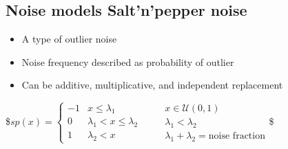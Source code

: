 \documentclass[letterpaper,10pt,english]{sphinxmanual}
\begin{document}
\begin{sphinxVerbatim}[commandchars=\\\{\}]
   
\end{sphinxVerbatim}

\noindent{}


\subsection{Noise models \sphinxhyphen{} Salt’n’pepper noise}
\label{\detokenize{02-ImageEnhancement:noise-models-salt-n-pepper-noise}}\begin{itemize}
\item {} 
\sphinxAtStartPar
A type of outlier noise

\item {} 
\sphinxAtStartPar
Noise frequency described as probability of outlier

\item {} 
\sphinxAtStartPar
Can be additive, multiplicative, and independent replacement

\end{itemize}

\sphinxAtStartPar
{}
\$\(sp(x)=\left\{\begin{array}{ll}
-1 & x\leq\lambda_1\\ 
0 & \lambda_1< x \leq \lambda_2\\
1 & \lambda_2<x
\end{array}\right.\qquad \begin{array}{l}x\in\mathcal{U}(0,1)\\\lambda_1<\lambda_2\\
\lambda_1+\lambda_2 = \mbox{noise fraction}
\end{array}\)\$
\end{document}
